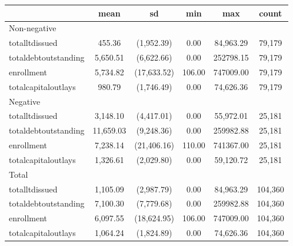 
\begin{tabular}{l*{1}{ccccc}}
\toprule
                    &        mean&          sd&         min&         max&       count\\
\midrule
Non-negative        &            &            &            &            &            \\
totalltdissued      &      455.36&  (1,952.39)&        0.00&   84,963.29&      79,179\\
totaldebtoutstanding&    5,650.51&  (6,622.66)&        0.00&   252798.15&      79,179\\
enrollment          &    5,734.82& (17,633.52)&      106.00&   747009.00&      79,179\\
totalcapitaloutlays &      980.79&  (1,746.49)&        0.00&   74,626.36&      79,179\\
\midrule
Negative            &            &            &            &            &            \\
totalltdissued      &    3,148.10&  (4,417.01)&        0.00&   55,972.01&      25,181\\
totaldebtoutstanding&   11,659.03&  (9,248.36)&        0.00&   259982.88&      25,181\\
enrollment          &    7,238.14& (21,406.16)&      110.00&   741367.00&      25,181\\
totalcapitaloutlays &    1,326.61&  (2,029.80)&        0.00&   59,120.72&      25,181\\
\midrule
Total               &            &            &            &            &            \\
totalltdissued      &    1,105.09&  (2,987.79)&        0.00&   84,963.29&     104,360\\
totaldebtoutstanding&    7,100.30&  (7,779.68)&        0.00&   259982.88&     104,360\\
enrollment          &    6,097.55& (18,624.95)&      106.00&   747009.00&     104,360\\
totalcapitaloutlays &    1,064.24&  (1,824.89)&        0.00&   74,626.36&     104,360\\
\bottomrule
\end{tabular}
